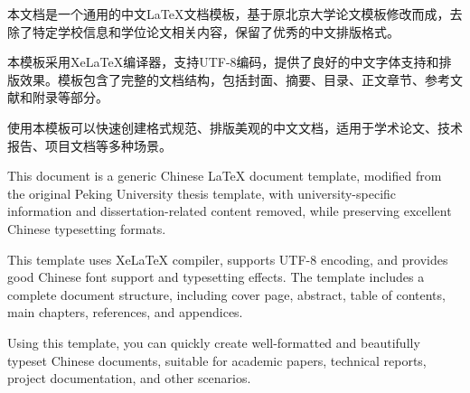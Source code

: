\begin{cabstract}
    本文档是一个通用的中文LaTeX文档模板，基于原北京大学论文模板修改而成，去除了特定学校信息和学位论文相关内容，保留了优秀的中文排版格式。
    
    本模板采用XeLaTeX编译器，支持UTF-8编码，提供了良好的中文字体支持和排版效果。模板包含了完整的文档结构，包括封面、摘要、目录、正文章节、参考文献和附录等部分。
    
    使用本模板可以快速创建格式规范、排版美观的中文文档，适用于学术论文、技术报告、项目文档等多种场景。
\end{cabstract}

\begin{eabstract}
    This document is a generic Chinese LaTeX document template, modified from the original Peking University thesis template, with university-specific information and dissertation-related content removed, while preserving excellent Chinese typesetting formats.
    
    This template uses XeLaTeX compiler, supports UTF-8 encoding, and provides good Chinese font support and typesetting effects. The template includes a complete document structure, including cover page, abstract, table of contents, main chapters, references, and appendices.
    
    Using this template, you can quickly create well-formatted and beautifully typeset Chinese documents, suitable for academic papers, technical reports, project documentation, and other scenarios.
\end{eabstract}
